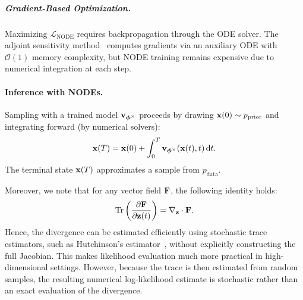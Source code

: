 \subparagraph{Gradient-Based Optimization.}  
Maximizing $\mathcal{L}_{\text{NODE}}$ requires backpropagation through the ODE solver. The adjoint sensitivity method~\citep{pontryagin2018mathematical, chen2018neural} computes gradients via an auxiliary ODE with $\mathcal{O}(1)$ memory complexity, but NODE training remains expensive due to numerical integration at each step.

\paragraph{Inference with NODEs.}  
Sampling with a trained model ${\mathbf{v}}_{\bm{\phi}^\times}$ proceeds by drawing ${\mathbf{x}}(0) \sim p_{\text{prior}}$ and integrating forward (by numerical solvers):
\[
{\mathbf{x}}(T) = {\mathbf{x}}(0) + \int_0^T {\mathbf{v}}_{\bm{\phi}^\times}({\mathbf{x}}(t), t)   \mathop{}\!\mathrm{d} t.
\]
The terminal state ${\mathbf{x}}(T)$ approximates a sample from $p_{\text{data}}$.

Moreover, we note that for any vector field ${\mathbf{F}}$, the following identity holds:
\[
    \operatorname{Tr}\left(\frac{\partial {\mathbf{F}}}{\partial {\mathbf{z}}(t)} \right) = \nabla_{{\mathbf{z}}} \cdot {\mathbf{F}}.
\]
Hence, the divergence can be estimated efficiently using stochastic trace
estimators, such as Hutchinson's estimator~\citep{hutchinson1989stochastic},
without explicitly constructing the full Jacobian. This makes likelihood
evaluation much more practical in high-dimensional settings. However, because
the trace is then estimated from random samples, the resulting numerical
log-likelihood estimate is stochastic rather than an exact evaluation of the
divergence.

